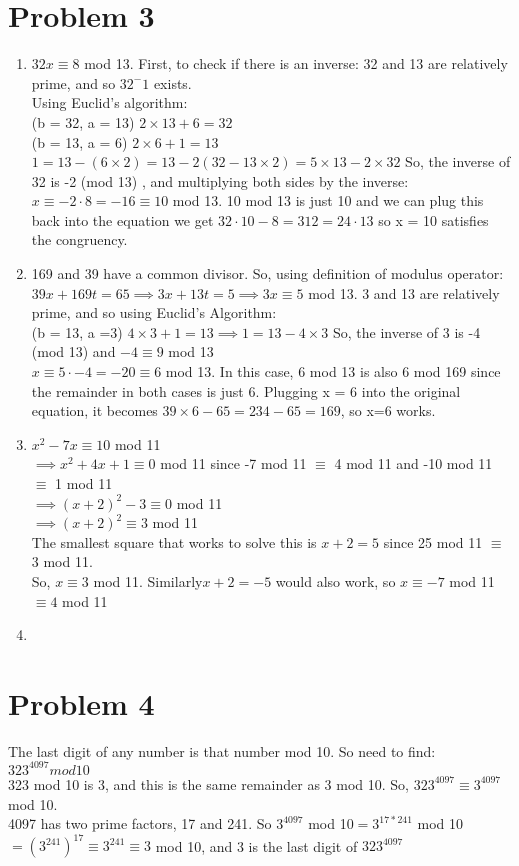 \documentclass[english]{article}
\begin{document}
\section*{Problem 3} 
\begin{enumerate} [label=\alph*]
\item $32x \equiv 8$ mod 13. First, to check if there is an inverse: 32 and 13 are relatively prime, and so $32^-1$ exists.\\
Using Euclid's algorithm:\\
(b = 32, a = 13) \qquad $2 \times 13 + 6 = 32$ \\
(b = 13, a = 6) \qquad $2 \times 6 + 1 = 13$\\
$  1 = 13 - (6 \times 2) = 13 - 2(32 - 13 \times 2) = 5 \times 13 -2 \times 32 $
So, the inverse of 32 is -2 (mod 13) , and multiplying both sides by the inverse:
$ x \equiv -2 \cdot 8 = -16 \equiv 10$ mod 13. 10 mod 13 is just 10 and we can 
plug this back into the equation we get $32 \cdot 10 - 8 = 312 = 24 \cdot 13$ so x = 10 satisfies the congruency.
\item 169 and 39 have a common divisor. So, using definition of modulus operator:
$ 39 x + 169t = 65 \implies 3 x + 13 t = 5 \implies 3x \equiv 5$ mod 13. 3 and 13 are relatively prime, and so using Euclid's Algorithm:\\
(b = 13, a =3) \qquad $ 4 \times 3 + 1 = 13 \implies 1 = 13 - 4 \times 3$
So, the inverse of 3 is -4 (mod 13) and $-4 \equiv 9$ mod 13\\
$ x \equiv 5 \cdot -4 = -20 \equiv 6$ mod 13. In this case, 6 mod 13 is also 6 mod 169 since
the remainder in both cases is just 6. Plugging x = 6 into the original equation, it becomes $39 \times 6 - 65 = 234 - 65 = 169$, so x=6 works. 
\item $x^2 - 7x \equiv 10 $ mod 11 \\
$ \implies x^2 + 4x + 1 \equiv 0$ mod 11 since -7 mod 11 $\equiv$ 4 mod 11 and -10 mod 11 $\equiv$ 1 mod 11 \\
$\implies (x + 2)^2 - 3 \equiv 0$ mod 11 \\
$\implies (x + 2) ^2 \equiv 3 $ mod 11 \\
The smallest square that works to solve this is $x + 2 =5$ since 25 mod 11 $\equiv$ 3 mod 11.\\
So, $x \equiv 3$ mod 11. Similarly$ x + 2 = -5$ would also work, so $x \equiv -7 $ mod 11 $\equiv 4$ mod 11
\item 
\end{enumerate}
\section*{Problem 4}
The last digit of any number is that number mod 10. So need to find: $323^{4097} mod 10$ \\
323 mod 10 is 3, and this is the same remainder as 3 mod 10. So, $323^{4097} \equiv 3^{4097}$ mod 10. \\
4097 has two prime factors, 17 and 241. So $3^{4097}$ mod 10$ = 3^{17*241}$ mod 10$ = (3^{241})^{17} \equiv 3^{241} \equiv 3$ mod 10, and 3 is the last digit of $323^{4097}$
\end{document}
